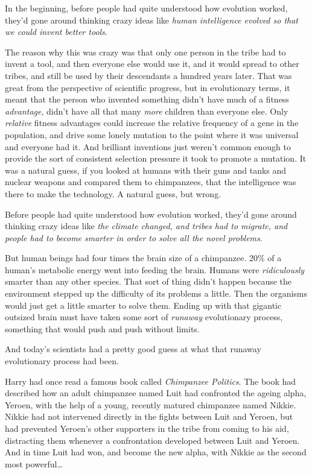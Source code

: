 In the beginning, before people had quite understood how evolution worked, they'd gone around thinking crazy ideas like \emph{human intelligence evolved so that we could invent better tools}.

The reason why this was crazy was that only one person in the tribe had to invent a tool, and then everyone else would use it, and it would spread to other tribes, and still be used by their descendants a hundred years later. That was great from the perspective of scientific progress, but in evolutionary terms, it meant that the person who invented something didn't have much of a fitness \emph{advantage}, didn't have all that many \emph{more} children than everyone else. Only \emph{relative} fitness advantages could increase the relative frequency of a gene in the population, and drive some lonely mutation to the point where it was universal and everyone had it. And brilliant inventions just weren't common enough to provide the sort of consistent selection pressure it took to promote a mutation. It was a natural guess, if you looked at humans with their guns and tanks and nuclear weapons and compared them to chimpanzees, that the intelligence was there to make the technology. A natural guess, but wrong.

Before people had quite understood how evolution worked, they'd gone around thinking crazy ideas like \emph{the climate changed, and tribes had to migrate, and people had to become smarter in order to solve all the novel problems}.

But human beings had four times the brain size of a chimpanzee. 20\% of a human's metabolic energy went into feeding the brain. Humans were \emph{ridiculously} smarter than any other species. That sort of thing didn't happen because the environment stepped up the difficulty of its problems a little. Then the organisms would just get a little smarter to solve them. Ending up with that gigantic outsized brain must have taken some sort of \emph{runaway} evolutionary process, something that would push and push without limits.

And today's scientists had a pretty good guess at what that runaway evolutionary process had been.

Harry had once read a famous book called \emph{Chimpanzee Politics}. The book had described how an adult chimpanzee named Luit had confronted the ageing alpha, Yeroen, with the help of a young, recently matured chimpanzee named Nikkie. Nikkie had not intervened directly in the fights between Luit and Yeroen, but had prevented Yeroen's other supporters in the tribe from coming to his aid, distracting them whenever a confrontation developed between Luit and Yeroen. And in time Luit had won, and become the new alpha, with Nikkie as the second most powerful{\ldots}

